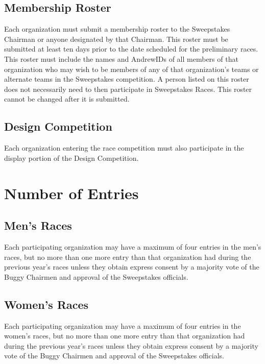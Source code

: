 \subsection{Membership Roster}

	Each organization must submit a membership roster to the Sweepstakes Chairman or anyone designated by that Chairman. This roster must be submitted at least ten days prior to the date scheduled for the preliminary races. This roster must include the names and AndrewIDs of all members of that organization who may wish to be members of any of that organization's teams or alternate teams in the Sweepstakes competition. A person listed on this roster does not necessarily need to then participate in Sweepstakes Races. This roster cannot be changed after it is submitted.

\subsection{Design Competition}

	Each organization entering the race competition must also participate in the display portion of the Design Competition.

\section{Number of Entries}

\subsection{Men's Races}

	Each participating organization may have a maximum of four entries in the men's races, but no more than one more entry than that organization had during the previous year's races unless they obtain express consent by a majority vote of the Buggy Chairmen and approval of the Sweepstakes officials.

\subsection{Women's Races}

	Each participating organization may have a maximum of four entries in the women's races, but no more than one more entry than that organization had during the previous year's races unless they obtain express consent by a majority vote of the Buggy Chairmen and approval of the Sweepstakes officials.

